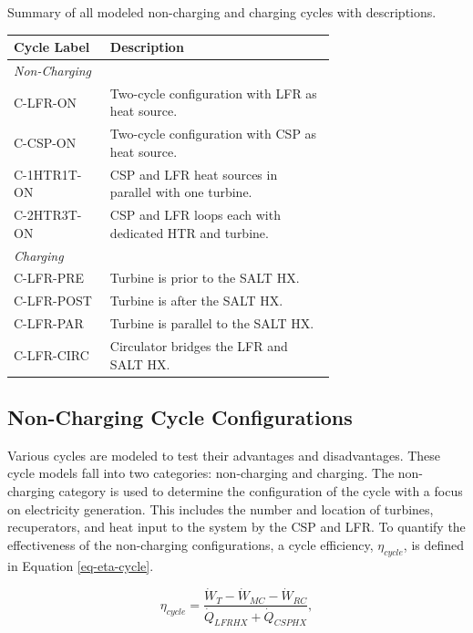 \begin{paracol}{2}
\begin{specialtable}[H] 
    \caption{Summary of all modeled non-charging and charging cycles with descriptions. \label{tab-cycle_sum}}
    \begin{tabular}{lL{0.7\linewidth}}
    \toprule
    \textbf{Cycle Label} & \textbf{Description}\\
    \midrule
    \textit{Non-Charging}\\
    C-LFR-ON & Two-cycle configuration with LFR as heat source.\\
    C-CSP-ON & Two-cycle configuration with CSP as heat source.\\
    C-1HTR1T-ON & CSP and LFR heat sources in parallel with one turbine.\\
    C-2HTR3T-ON & CSP and LFR loops each with dedicated HTR and turbine.\\
    \midrule
    \textit{Charging}\\
    C-LFR-PRE & Turbine is prior to the SALT HX.\\
    C-LFR-POST & Turbine is after the SALT HX.\\
    C-LFR-PAR & Turbine is parallel to the SALT HX.\\
    C-LFR-CIRC & Circulator bridges the LFR and SALT HX.\\
    \bottomrule
    \end{tabular}
\end{specialtable}

\subsection{Non-Charging Cycle Configurations} 

Various cycles are modeled to test their advantages and disadvantages. These cycle models fall into two categories: non-charging and charging. The non-charging category is used to determine the configuration of the cycle with a focus on electricity generation. This includes the number and location of turbines, recuperators, and heat input to the system by the CSP and LFR. To quantify the effectiveness of the non-charging configurations, a cycle efficiency, $\eta_{cycle}$, is defined in Equation \ref{eq-eta-cycle}.

\begin{equation}
    \label{eq-eta-cycle}
    \eta_{cycle} = \frac{\dot{W}_{T}-\dot{W}_{MC}-\dot{W}_{RC}}{\dot{Q}_{LFRHX}+\dot{Q}_{CSPHX}},
\end{equation}


\end{paracol}
